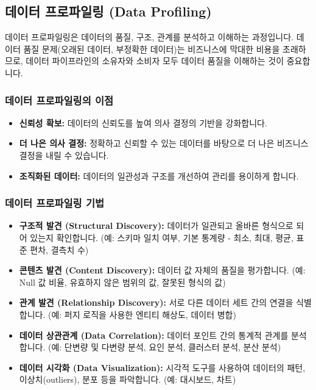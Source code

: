 \documentclass[11pt,a4paper]{article}
\theoremstyle{definition}
\begin{document}
\subsection{데이터 프로파일링 (Data Profiling)}
데이터 프로파일링은 데이터의 품질, 구조, 관계를 분석하고 이해하는 과정입니다. 데이터 품질 문제(오래된 데이터, 부정확한 데이터)는 비즈니스에 막대한 비용을 초래하므로, 데이터 파이프라인의 소유자와 소비자 모두 데이터 품질을 이해하는 것이 중요합니다.

\subsubsection{데이터 프로파일링의 이점}
\begin{itemize}
    \item \textbf{신뢰성 확보:} 데이터의 신뢰도를 높여 의사 결정의 기반을 강화합니다.
    \item \textbf{더 나은 의사 결정:} 정확하고 신뢰할 수 있는 데이터를 바탕으로 더 나은 비즈니스 결정을 내릴 수 있습니다.
    \item \textbf{조직화된 데이터:} 데이터의 일관성과 구조를 개선하여 관리를 용이하게 합니다.
\end{itemize}

\subsubsection{데이터 프로파일링 기법}
\begin{itemize}
    \item \textbf{구조적 발견 (Structural Discovery):} 데이터가 일관되고 올바른 형식으로 되어 있는지 확인합니다. (예: 스키마 일치 여부, 기본 통계량 - 최소, 최대, 평균, 표준 편차, 결측치 수)
    \item \textbf{콘텐츠 발견 (Content Discovery):} 데이터 값 자체의 품질을 평가합니다. (예: Null 값 비율, 유효하지 않은 범위의 값, 잘못된 형식의 값)
    \item \textbf{관계 발견 (Relationship Discovery):} 서로 다른 데이터 세트 간의 연결을 식별합니다. (예: 퍼지 로직을 사용한 엔티티 해상도, 데이터 병합)
    \item \textbf{데이터 상관관계 (Data Correlation):} 데이터 포인트 간의 통계적 관계를 분석합니다. (예: 단변량 및 다변량 분석, 요인 분석, 클러스터 분석, 분산 분석)
    \item \textbf{데이터 시각화 (Data Visualization):} 시각적 도구를 사용하여 데이터의 패턴, 이상치(outliers), 분포 등을 파악합니다. (예: 대시보드, 차트)
\end{itemize}
\end{document}
